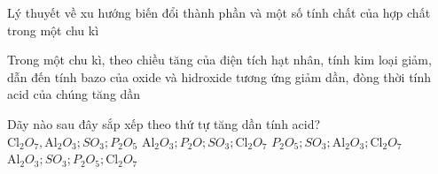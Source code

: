 \begin{dang}{Lý thuyết về xu hướng biến đổi thành phần và một số tính chất của hợp chất trong một chu kì}\end{dang}
\begin{pp}
	Trong một chu kì, theo chiều tăng của điện tích hạt nhân, tính kim loại giảm, dẫn đến tính bazo của oxide và hidroxide tương ứng giảm dần, đòng thời tính acid của chúng tăng dần
\end{pp}
\begin{vdex}
	Dãy nào sau đây sắp xếp theo thứ tự tăng dần tính acid?
	\choice
	{$\mathrm{Cl}_2O_7, \mathrm{Al}_2O_3; SO_3; P_2O_5$}
	{\True $\mathrm{Al}_2O_3; P_2O; SO_3; \mathrm{Cl}_2O_7$}
	{$P_2O_5; SO_3; \mathrm{Al}_2O_3; \mathrm{Cl}_2O_7$}
	{$\mathrm{Al}_2O_3; SO_3; P_2O_5; \mathrm{Cl}_2O_7$}
\end{vdex}

